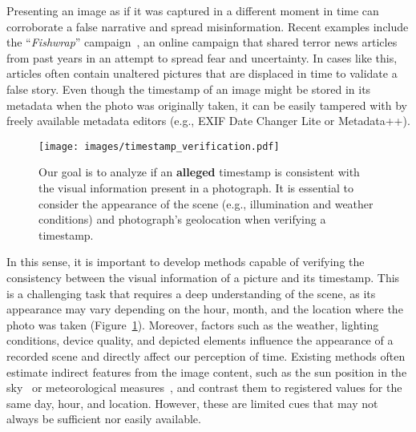 \documentclass[journal]{IEEEtran}
\begin{document}
    Presenting an image as if it was captured in a different moment in time can corroborate a false narrative and spread misinformation. Recent examples include the ``\emph{Fishwrap}'' campaign~\cite{guardian2019fishwrap}, an online campaign that shared terror news articles from past years in an attempt to spread fear and uncertainty. In cases like this, articles often contain unaltered pictures that are displaced in time to validate a false story. Even though the timestamp of an image might be stored in its metadata when the photo was originally taken, it can be easily tampered with by freely available metadata editors (e.g., EXIF Date Changer Lite or Metadata++).
    
    
    \begin{figure}[t!]
        \centering
        \texttt{[image: images/timestamp\_verification.pdf]}
        \caption{Our goal is to analyze if an \textbf{alleged} timestamp is consistent with the visual information present in a photograph. It is essential to consider the appearance of the scene (e.g., illumination and weather conditions) and photograph's geolocation when verifying a timestamp.}
        \label{fig:timestamp_verification}
    \end{figure}
    
    In this sense, it is important to develop methods capable of verifying the consistency between the visual information of a picture and its timestamp. This is a challenging task that requires a deep understanding of the scene, as its appearance may vary depending on the hour, month, and the location where the photo was taken (Figure~\ref{fig:timestamp_verification}). Moreover, factors such as the weather, lighting conditions, device quality, and depicted elements influence the appearance of a recorded scene and directly affect our perception of time. Existing methods often estimate indirect features from the image content, such as the sun position in the sky~\cite{ghosh2017detection, kakar2012verifying, li2017you} or meteorological measures~\cite{ghosh2017detection}, and contrast them to registered values for the same day, hour, and location. However, these are limited cues that may not always be sufficient nor easily available.
    
\end{document}
